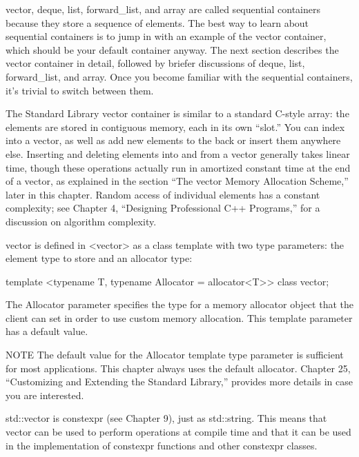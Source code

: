 
vector, deque, list, forward\_list, and array are called sequential containers because they store a sequence of elements. The best way to learn about sequential containers is to jump in with an example of the vector container, which should be your default container anyway. The next section describes the vector container in detail, followed by briefer discussions of deque, list, forward\_list, and array. Once you become familiar with the sequential containers, it’s trivial to switch between them.


The Standard Library vector container is similar to a standard C-style array: the elements are stored in contiguous memory, each in its own “slot.” You can index into a vector, as well as add new elements to the back or insert them anywhere else. Inserting and deleting elements into and from a vector generally takes linear time, though these operations actually run in amortized constant time at the end of a vector, as explained in the section “The vector Memory Allocation Scheme,” later in this chapter. Random access of individual elements has a constant complexity; see Chapter 4, “Designing Professional C++ Programs,” for a discussion on algorithm complexity.


vector is defined in <vector> as a class template with two type parameters: the element type to store and an allocator type:

\begin{cpp}
template <typename T, typename Allocator = allocator<T>> class vector;
\end{cpp}

The Allocator parameter specifies the type for a memory allocator object that the client can set in order to use custom memory allocation. This template parameter has a default value.

\begin{myNotic}{NOTE}
The default value for the Allocator template type parameter is sufficient for most applications. This chapter always uses the default allocator. Chapter 25, “Customizing and Extending the Standard Library,” provides more details in case you are interested.
\end{myNotic}

std::vector is constexpr (see Chapter 9), just as std::string. This means that vector can be used to perform operations at compile time and that it can be used in the implementation of constexpr functions and other constexpr classes.

